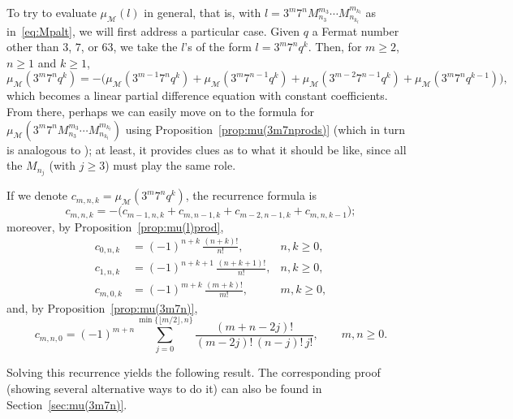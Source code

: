 \documentclass[11pt, a4paper]{article}
\newcommand{\calM}{\mathcal{M}}
\newcommand{\muM}{\mu_\calM}
\theoremstyle{plain}
\theoremstyle{definition}
\begin{document}
To try to evaluate $\muM(l)$ in general, 
that is, with $l = 3^m 7^n M_{n_3}^{m_3} \cdots M_{n_{k_l}}^{m_{k_l}}$ as in~\eqref{eq:Mpalt}, 
we will first address a particular case. Given $q$ a Fermat number other than $3$, $7$, or $63$, we take the $l$'s of the form $l = 3^m7^n q^k$.
Then, for $m \ge 2$, $n \ge 1$ and $k \ge 1$,
\[
  \muM(3^m7^n q^k) = -\Big( \muM(3^{m-1}7^n q^k) + \muM(3^m7^{n-1} q^k) 
  + \muM(3^{m-2}7^{n-1} q^k) + \muM(3^m7^n q^{k-1}) \Big),
\]
which becomes a linear partial difference equation with constant coefficients. From there, perhaps we can easily move on to the formula for $\muM(3^m 7^nM_{n_3}^{m_3} \cdots M_{n_{k_l}}^{m_{k_l}})$ using Proposition~\ref{prop:mu(3m7nprods)} (which in turn is analogous to \cite [Section 2.6]{MoNaVa}); at least, it provides clues as to what it should be like, since all the $M_{n_j}$ (with $j \ge 3$) must play the same role.

If we denote $c_{m,n,k} = \muM(3^m 7^n q^k)$, the recurrence formula is
\begin{equation*}
  c_{m,n,k} = -\Big( c_{m-1,n,k} + c_{m,n-1,k} + c_{m-2,n-1,k} + c_{m,n,k-1} \Big);
\end{equation*}
moreover, by Proposition~\ref{prop:mu(l)prod},
\begin{align*}
  c_{0,n,k} &= (-1)^{n+k} \,\frac{(n+k)!}{n!}, & n,k \ge 0,\\
  c_{1,n,k} &= (-1)^{n+k+1} \,\frac{(n+k+1)!}{n!}, & n,k \ge 0,\\
  c_{m,0,k} &= (-1)^{m+k} \,\frac{(m+k)!}{m!}, & m,k \ge 0,
\end{align*}
and, by Proposition~\ref{prop:mu(3m7n)},
\begin{equation*}
  c_{m,n,0} 
  = (-1)^{m+n} \sum_{j=0}^{\min\{\lfloor m/2\rfloor, n\}} 
  \frac{(m+n-2j)!}{(m-2j)!\,(n-j)!\,j!},
  \qquad m,n \ge 0.
\end{equation*}

Solving this recurrence yields the following result. The corresponding proof (showing several alternative ways to do it) can also be found in Section~\ref{sec:mu(3m7n)}.
\end{document}
